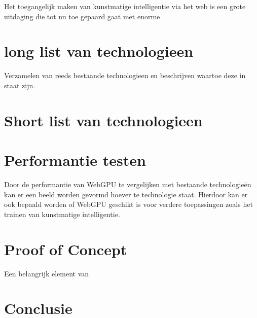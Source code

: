 Het toegangelijk maken van kunstmatige intelligentie via het web is een grote uitdaging die tot nu toe gepaard gaat met enorme 

\section{long list van technologieen}

Verzamelen van reeds bestaande technologieen en beschrijven waartoe deze in staat zijn.

\section{Short list van technologieen}

\section{Performantie testen}

Door de performantie van WebGPU te vergelijken met bestaande technologieën kan er een beeld worden gevormd hoever te technologie staat. Hierdoor kan er ook bepaald worden of WebGPU geschikt is voor verdere toepassingen zoals het trainen van kunstmatige intelligentie.

\section{Proof of Concept}

Een belangrijk element van

\section{Conclusie}



